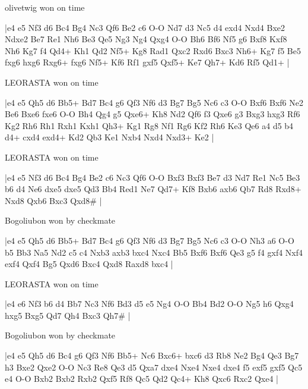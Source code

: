 \showboard

olivetwig won on time

\makegametitle
|e4 e5 Nf3 d6 Bc4 Bg4 Nc3 Qf6 Be2 c6 O-O Nd7 d3 Nc5 d4 exd4 Nxd4 Bxe2 Ndxe2 Be7 Re1 Nh6 Be3 Qe5 Ng3 Ng4 Qxg4 O-O Bh6 Bf6 Nf5 g6 Bxf8 Kxf8 Nh6 Kg7 f4 Qd4+ Kh1 Qd2 Nf5+ Kg8 Rad1 Qxc2 Rxd6 Bxc3 Nh6+ Kg7 f5 Be5 fxg6 hxg6 Rxg6+ fxg6 Nf5+ Kf6 Rf1 gxf5 Qxf5+ Ke7 Qh7+ Kd6 Rf5 Qd1+  |

\showboard

LEORASTA won on time

\makegametitle
|e4 e5 Qh5 d6 Bb5+ Bd7 Bc4 g6 Qf3 Nf6 d3 Bg7 Bg5 Nc6 c3 O-O Bxf6 Bxf6 Ne2 Be6 Bxe6 fxe6 O-O Bh4 Qg4 g5 Qxe6+ Kh8 Nd2 Qf6 f3 Qxe6 g3 Bxg3 hxg3 Rf6 Kg2 Rh6 Rh1 Rxh1 Kxh1 Qh3+ Kg1 Rg8 Nf1 Rg6 Kf2 Rh6 Ke3 Qe6 a4 d5 b4 d4+ cxd4 exd4+ Kd2 Qb3 Ke1 Nxb4 Nxd4 Nxd3+ Ke2  |

\showboard

LEORASTA won on time

\makegametitle
|e4 e5 Nf3 d6 Bc4 Bg4 Be2 c6 Nc3 Qf6 O-O Bxf3 Bxf3 Be7 d3 Nd7 Re1 Nc5 Be3 b6 d4 Ne6 dxe5 dxe5 Qd3 Bb4 Red1 Ne7 Qd7+ Kf8 Bxb6 axb6 Qb7 Rd8 Rxd8+ Nxd8 Qxb6 Bxc3 Qxd8\#  |

\showboard

Bogoliubon won by checkmate

\makegametitle
|e4 e5 Qh5 d6 Bb5+ Bd7 Bc4 g6 Qf3 Nf6 d3 Bg7 Bg5 Nc6 c3 O-O Nh3 a6 O-O b5 Bb3 Na5 Nd2 c5 c4 Nxb3 axb3 bxc4 Nxc4 Bb5 Bxf6 Bxf6 Qe3 g5 f4 gxf4 Nxf4 exf4 Qxf4 Bg5 Qxd6 Bxc4 Qxd8 Raxd8 bxc4  |

\showboard

LEORASTA won on time

\makegametitle
|e4 e6 Nf3 b6 d4 Bb7 Nc3 Nf6 Bd3 d5 e5 Ng4 O-O Bb4 Bd2 O-O Ng5 h6 Qxg4 hxg5 Bxg5 Qd7 Qh4 Bxc3 Qh7\#  |

\showboard

Bogoliubon won by checkmate

\makegametitle
|e4 e5 Qh5 d6 Bc4 g6 Qf3 Nf6 Bb5+ Nc6 Bxc6+ bxc6 d3 Rb8 Ne2 Bg4 Qe3 Bg7 h3 Bxe2 Qxe2 O-O Nc3 Re8 Qe3 d5 Qxa7 dxe4 Nxe4 Nxe4 dxe4 f5 exf5 gxf5 Qc5 e4 O-O Bxb2 Bxb2 Rxb2 Qxf5 Rf8 Qc5 Qd2 Qc4+ Kh8 Qxc6 Rxc2 Qxe4  |

